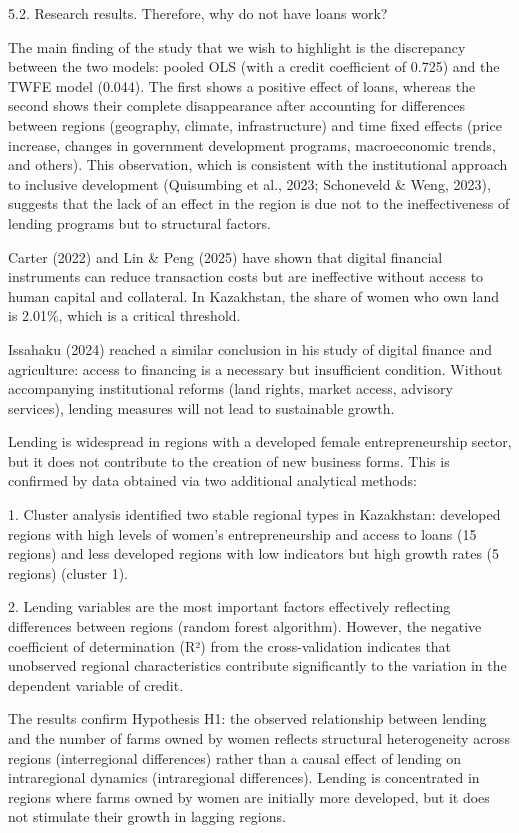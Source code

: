 \documentclass[
]{article}
\begin{document}
5.2. Research results. Therefore, why do not have loans work?

The main finding of the study that we wish to highlight is the
discrepancy between the two models: pooled OLS (with a credit
coefficient of 0.725) and the TWFE model (0.044). The first shows a
positive effect of loans, whereas the second shows their complete
disappearance after accounting for differences between regions
(geography, climate, infrastructure) and time fixed effects (price
increase, changes in government development programs, macroeconomic
trends, and others). This observation, which is consistent with the
institutional approach to inclusive development (Quisumbing et al.,
2023; Schoneveld \& Weng, 2023), suggests that the lack of an effect in
the region is due not to the ineffectiveness of lending programs but to
structural factors.

Carter (2022) and Lin \& Peng (2025) have shown that digital financial
instruments can reduce transaction costs but are ineffective without
access to human capital and collateral. In Kazakhstan, the share of
women who own land is 2.01\%, which is a critical threshold.

Issahaku (2024) reached a similar conclusion in his study of digital
finance and agriculture: access to financing is a necessary but
insufficient condition. Without accompanying institutional reforms (land
rights, market access, advisory services), lending measures will not
lead to sustainable growth.

Lending is widespread in regions with a developed female
entrepreneurship sector, but it does not contribute to the creation of
new business forms. This is confirmed by data obtained via two
additional analytical methods:

1. Cluster analysis identified two stable regional types in Kazakhstan:
developed regions with high levels of women's entrepreneurship and
access to loans (15 regions) and less developed regions with low
indicators but high growth rates (5 regions) (cluster 1).

2. Lending variables are the most important factors effectively
reflecting differences between regions (random forest algorithm).
However, the negative coefficient of determination (R²) from the
cross-validation indicates that unobserved regional characteristics
contribute significantly to the variation in the dependent variable of
credit.

The results confirm Hypothesis H1: the observed relationship between
lending and the number of farms owned by women reflects structural
heterogeneity across regions (interregional differences) rather than a
causal effect of lending on intraregional dynamics (intraregional
differences). Lending is concentrated in regions where farms owned by
women are initially more developed, but it does not stimulate their
growth in lagging regions.
\end{document}
